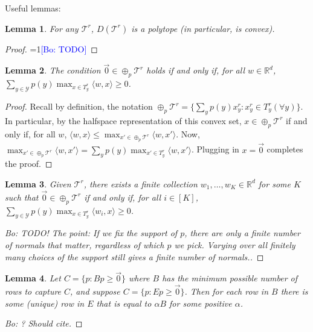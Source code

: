\documentclass[12pt]{article}
\newcommand{\Comments}{1}
\newcommand{\mynote}[2]{\ifnum\Comments=1\textcolor{#1}{#2}\fi}
\newcommand{\bo}[1]{\mynote{blue}{[Bo: #1]}}
\newcommand{\reals}{\mathbb{R}}
\newcommand{\T}{\mathcal{T}}
\newcommand{\Y}{\mathcal{Y}}
\newcommand{\inprod}[2]{\langle #1, #2 \rangle}%
\newtheorem{lemma}{Lemma}
\begin{document}
  Useful lemmas:
  \begin{lemma} \label{lemma:D-polytope}
    For any $\T^r$, $D(\T^r)$ is a polytope (in particular, is convex).
  \end{lemma}
  \begin{proof}
    \bo{TODO}
  \end{proof}
  \begin{lemma}  \label{lemma:minkowski-support-all}
    The condition $\vec 0 \in \oplus_p \T^r$ holds if and only if, for all $w \in \reals^d$, $\sum_{y \in \Y} p(y) \max_{x \in T^r_y} \inprod{w}{x} \geq 0$.
  \end{lemma}
  \begin{proof}
    Recall by definition, the notation $\oplus_p \T^r = \{\sum_y p(y) x^r_y : x^r_y \in T^r_y (\forall y)\}$.
    In particular, by the halfspace representation of this convex set, $x \in \oplus_p \T^r$ if and only if, for all $w$, $\inprod{w}{x} \leq \max_{x' \in \oplus_p \T^r} \inprod{w}{x'}$.
    Now, $\max_{x' \in \oplus_p \T^r} \inprod{w}{x'} = \sum_y p(y) \max_{x' \in T^r_y} \inprod{w}{x'}$.
    Plugging in $x = \vec{0}$ completes the proof.
  \end{proof}
  \begin{lemma} \label{lemma:minkowski-support-finite}
    Given $\T^r$, there exists a finite collection $w_1,\ldots,w_K \in \reals^d$ for some $K$ such that $\vec 0 \in \oplus_p \T^r$ if and only if, for all $i \in [K]$, $\sum_{y \in \Y} p(y) \max_{x \in T^r_y} \inprod{w_i}{x} \geq 0$.
  \end{lemma}
  \begin{proof}
    [Bo: TODO! The point: If we fix the support of $p$, there are only a finite number of normals that matter, regardless of which $p$ we pick. Varying over all finitely many choices of the support still gives a finite number of normals.]
  \end{proof}
  \begin{lemma} \label{lemma:E-to-B}
    Let $C = \{p : Bp \geq \vec 0 \}$ where $B$ has the minimum possible number of rows to capture $C$, and suppose $C = \{p : Ep \geq \vec 0 \}$.
    Then for each row in $B$ there is some (unique) row in $E$ that is equal to $\alpha B$ for some positive $\alpha$.
  \end{lemma}
  \begin{proof}
    [Bo: ? Should cite]
  \end{proof}
\end{document}
